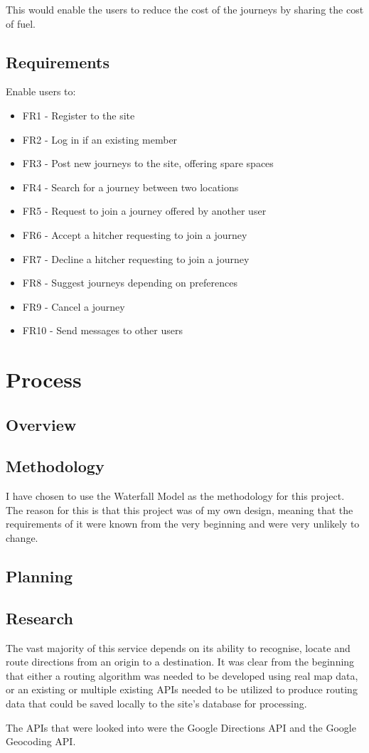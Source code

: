 	This would enable the users to reduce the cost of the journeys by sharing the cost of fuel.
	
\subsection{Requirements}
Enable users to:
\begin{itemize}
\item FR1 - Register to the site
\item FR2 - Log in if an existing member
\item FR3 - Post new journeys  to the site, offering spare spaces
\item FR4 - Search for a journey between two locations
\item FR5 - Request to join a journey offered by another user
\item FR6 - Accept a hitcher requesting to join a journey
\item FR7 - Decline a hitcher requesting to join a journey
\item FR8 - Suggest journeys depending on preferences
\item FR9 - Cancel a journey
\item FR10 - Send messages to other users
\end{itemize}

\section{Process}

\subsection{Overview}

\subsection{Methodology}
I have chosen to use the Waterfall Model as the methodology for this project. The reason for this is that this project was of my own design, meaning that the requirements of it were known from the very beginning and were very unlikely to change. 
\subsection{Planning}

\subsection{Research}
The vast majority of this service depends on its ability to recognise, locate and route directions from an origin to a destination. It was clear from the beginning that either a routing algorithm was needed to be developed using real map data, or an existing or multiple existing APIs needed to be utilized to produce routing data that could be saved locally to the site's database for processing. 

The APIs that were looked into were the Google Directions API \cite{google_directions_api} and the Google Geocoding API. 
